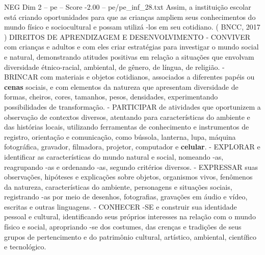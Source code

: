 \begin{textsample}{NEG Dim 2 – pe – Score -2.00 – pe/pe\_inf\_28.txt}
Assim, a instituição escolar está criando oportunidades para que as crianças ampliem seus conhecimentos do mundo físico e sociocultural e possam utilizá -los em seu cotidiano. ( BNCC, 2017 ) DIREITOS DE APRENDIZAGEM E DESENVOLVIMENTO - CONVIVER com crianças e adultos e com eles criar estratégias para investigar o mundo social e natural, demonstrando atitudes positivas em relação a situações que envolvam diversidade étnico-racial, ambiental, de gênero, de língua, de religião. - BRINCAR com materiais e objetos cotidianos, associados a diferentes papéis ou \textbf{cenas} sociais, e com elementos da natureza que apresentam diversidade de formas, cheiros, cores, tamanhos, pesos, densidades, experimentando possibilidades de transformação. - PARTICIPAR de atividades que oportunizem a observação de contextos diversos, atentando para características do ambiente e das histórias locais, utilizando ferramentas de conhecimento e instrumentos de registro, orientação e comunicação, como bússola, lanterna, lupa, máquina fotográfica, gravador, filmadora, projetor, computador e \textbf{celular}. - EXPLORAR e identificar as características do mundo natural e social, nomeando -as, reagrupando -as e ordenando -as, segundo critérios diversos. - EXPRESSAR suas observações, hipóteses e explicações sobre objetos, organismos vivos, fenômenos da natureza, características do ambiente, personagens e situações sociais, registrando -as por meio de desenhos, fotografias, gravações em áudio e vídeo, escritas e outras linguagens. - CONHECER -SE e construir sua identidade pessoal e cultural, identificando seus próprios interesses na relação com o mundo físico e social, apropriando -se dos costumes, das crenças e tradições de seus grupos de pertencimento e do patrimônio cultural, artístico, ambiental, científico e tecnológico.

\end{textsample}
